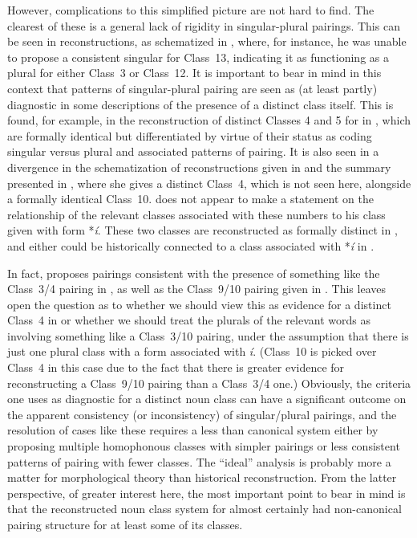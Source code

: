 \documentclass[output=paper ,collection	  ,collectionchapter ,biblatexbackend=biber   ]{langscibook}
\begin{document}
However, complications to this simplified picture are not hard to find. The
clearest of these is a general lack of rigidity in singular-plural pairings.
This can be seen in  reconstructions, as schematized in
, where, for instance, he was unable to propose a consistent
singular for Class~13, indicating it as functioning as a plural for either
Class~3 or Class~12. It is important to bear in mind in this context that
patterns of singular-plural pairing are seen as (at least partly) diagnostic in
some descriptions of the presence of a distinct class itself. This is found, for
example, in the reconstruction of distinct Classes 4 and 5 for  in , which are formally identical
but differentiated by virtue of their status as coding singular versus plural
and associated patterns of pairing. It is also seen in a divergence in the
schematization of  reconstructions given in
 and the summary presented in
, where she gives a distinct Class~4, which
is not seen here, alongside a formally identical Class~10.
\citet[52]{deWolf1971} does not appear to make a statement on the
relationship of the relevant  classes associated with these numbers
to his class given with form *\emph{í}. These two classes are reconstructed as
formally distinct in , and either could be historically connected to
a class associated with *\emph{í} in .

In fact,  proposes pairings consistent with the presence
of something like the Class~3/4 pairing in , as well as the
Class~9/10 pairing given in . This leaves open the question as
to whether we should view this as evidence for a distinct Class~4 in
 or whether we should treat the plurals of the relevant words
as involving something like a Class~3/10 pairing, under the assumption that there
is just one plural class with a form associated with \emph{í}. (Class~10 is
picked over Class~4 in this case due to the fact that there is greater evidence
for reconstructing a Class~9/10 pairing than a Class~3/4 one.) Obviously, the
criteria one uses as diagnostic for a distinct noun class can have a significant
outcome on the apparent consistency (or inconsistency) of singular/plural
pairings, and the resolution of cases like these requires a less than
canonical system either by proposing multiple homophonous classes with simpler
pairings or less consistent patterns of pairing with fewer classes. The
``ideal''  analysis is probably more a matter for morphological theory than
historical reconstruction. From the latter perspective, of greater
interest here, the most important point to bear in mind is that the
reconstructed noun class system for  almost certainly had
non-canonical pairing structure for at least some of its classes.
\end{document}
